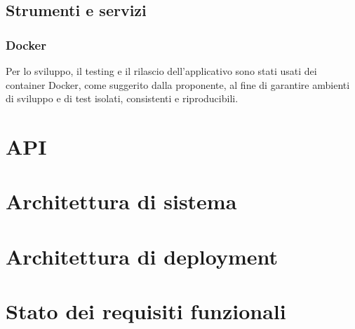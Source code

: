 \documentclass[10pt]{article}
\begin{document}
\begin{justify}
    \subsection{Strumenti e servizi}
        \subsubsection{Docker}
        Per lo sviluppo, il testing e il rilascio dell'applicativo sono stati usati dei container Docker, come suggerito dalla proponente, al fine di garantire ambienti di 
        sviluppo e di test isolati, consistenti e riproducibili.\\



\section{API}


\section{Architettura di sistema}


\section{Architettura di deployment}


\section{Stato dei requisiti funzionali}


\end{justify}
\end{document}
